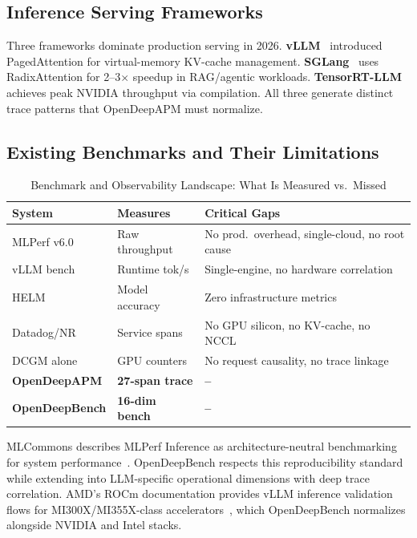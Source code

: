 \documentclass[conference,10pt]{IEEEtran}
\begin{document}
\subsection{Inference Serving Frameworks}
Three frameworks dominate production serving in 2026. \textbf{vLLM}~\cite{kwon2023vllm} introduced PagedAttention for virtual-memory KV-cache management. \textbf{SGLang}~\cite{zheng2024sglang} uses RadixAttention for 2--3$\times$ speedup in RAG/agentic workloads. \textbf{TensorRT-LLM}~\cite{nvidia2024tensorrtllm} achieves peak NVIDIA throughput via compilation. All three generate distinct trace patterns that OpenDeepAPM must normalize.

\subsection{Existing Benchmarks and Their Limitations}

\begin{table}[!htbp]
\caption{Benchmark and Observability Landscape: What Is Measured vs.\ Missed}
\label{tab:gaps}
\centering\footnotesize
\begin{tabular}{@{}lp{1.4cm}p{3.4cm}@{}}
\toprule
\textbf{System} & \textbf{Measures} & \textbf{Critical Gaps} \\
\midrule
MLPerf v6.0~\cite{mlcommons2026mlperfv6} & Raw throughput & No prod.\ overhead, single-cloud, no root cause \\
vLLM bench & Runtime tok/s & Single-engine, no hardware correlation \\
HELM~\cite{liang2023helm} & Model accuracy & Zero infrastructure metrics \\
Datadog/NR & Service spans & No GPU silicon, no KV-cache, no NCCL \\
DCGM alone & GPU counters & No request causality, no trace linkage \\
\textbf{OpenDeepAPM} & \textbf{27-span trace} & \textbf{--} \\
\textbf{OpenDeepBench} & \textbf{16-dim bench} & \textbf{--} \\
\bottomrule
\end{tabular}
\end{table}

MLCommons describes MLPerf Inference as architecture-neutral benchmarking for system performance~\cite{mlcommons2026mlperfv6}. OpenDeepBench respects this reproducibility standard while extending into LLM-specific operational dimensions with deep trace correlation. AMD's ROCm documentation provides vLLM inference validation flows for MI300X/MI355X-class accelerators~\cite{amd2025mi350}, which OpenDeepBench normalizes alongside NVIDIA and Intel stacks.
\end{document}
